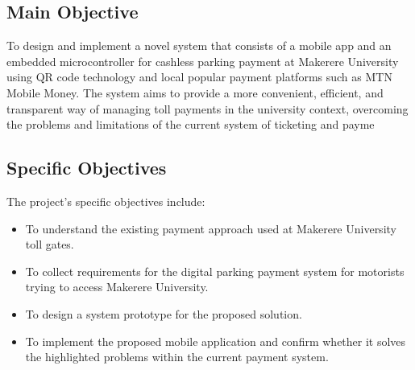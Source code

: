 \subsection{Main Objective}
To design and implement a novel system that consists of a mobile app and an embedded microcontroller for cashless parking payment at Makerere University using QR code technology and local popular payment platforms such as MTN Mobile Money. The system aims to provide a more convenient, efficient, and transparent way of managing toll payments in the university context, overcoming the problems and limitations of the current system of ticketing and payme

\subsection{Specific Objectives}
The project's specific objectives include:
\begin{itemize}
    \item To understand the existing payment approach used at Makerere University toll gates.
    \item To collect requirements for the digital parking payment system for motorists trying to access Makerere University.
    \item To design a system prototype for the proposed solution.
    \item To implement the proposed mobile application and confirm whether it solves the highlighted problems within the current payment system.
\end{itemize}
